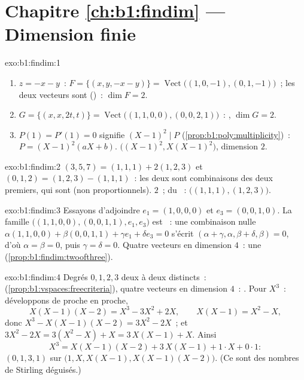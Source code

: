 \section*{Chapitre \ref{ch:b1:findim} --- Dimension finie}

\begin{solution}{exo:b1:findim:1}
\begin{enumerate}
  \item $z = -x - y$~: $F = \{(x, y, -x-y)\} =
        \operatorname{Vect}\bigl((1,0,-1), (0,1,-1)\bigr)$~; les deux
        vecteurs sont  ()~: $\dim F = 2$.
  \item $G = \{(x, x, 2t, t)\} =
        \operatorname{Vect}\bigl((1,1,0,0), (0,0,2,1)\bigr)$~: ,
        $\dim G = 2$.
  \item $P(1) = P'(1) = 0$ signifie $(X-1)^2 \mid P$
        (\cref{prop:b1:poly:multiplicity})~: $P = (X-1)^2(aX + b)$.
         $\bigl((X-1)^2, X(X-1)^2\bigr)$, dimension $2$.
\end{enumerate}
\end{solution}

\begin{solution}{exo:b1:findim:2}
$(3,5,7) = (1,1,1) + 2(1,2,3)$ et $(0,1,2) = (1,2,3) - (1,1,1)$~:
les deux sont combinaisons des deux premiers, qui sont  (non
proportionnels).  $2$~;  du ~:
$\bigl((1,1,1), (1,2,3)\bigr)$.
\end{solution}

\begin{solution}{exo:b1:findim:3}
Essayons d'adjoindre $e_1 = (1,0,0,0)$ et $e_3 = (0,0,1,0)$. La famille
$\bigl((1,1,0,0), (0,0,1,1), e_1, e_3\bigr)$ est ~: une
combinaison nulle $\alpha(1,1,0,0) + \beta(0,0,1,1) + \gamma e_1 + \delta
e_3 = 0$ s'écrit $(\alpha + \gamma, \alpha, \beta + \delta, \beta) =
0$, d'où $\alpha = \beta = 0$, puis $\gamma = \delta = 0$. Quatre
vecteurs  en dimension $4$~: une 
(\cref{prop:b1:findim:twoofthree}).
\end{solution}

\begin{solution}{exo:b1:findim:4}
Degrés $0, 1, 2, 3$ deux à deux distincts~: 
(\cref{prop:b1:vspaces:freecriteria}), quatre vecteurs en dimension
$4$~: . Pour $X^3$~: développons de proche en proche,
\[
X(X-1)(X-2) = X^3 - 3X^2 + 2X,
\qquad
X(X-1) = X^2 - X,
\]
donc $X^3 - X(X-1)(X-2) = 3X^2 - 2X$~; et $3X^2 - 2X = 3(X^2 - X) + X
= 3\,X(X-1) + X$. Ainsi
\[
X^3 = X(X-1)(X-2) + 3\,X(X-1) + 1\cdot X + 0\cdot 1 :
\]
 $(0, 1, 3, 1)$ sur $\bigl(1, X, X(X-1),
X(X-1)(X-2)\bigr)$. (Ce sont des nombres de Stirling déguisés.)
\end{solution}


